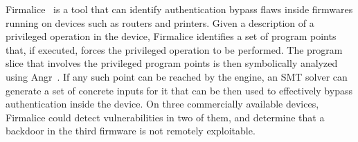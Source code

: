 Firmalice~\cite{FIRMALICE-NDSS15} is a tool that can identify authentication bypass flaws inside firmwares running on devices such as routers and printers. Given a description of a privileged operation in the device, Firmalice identifies a set of program points that, if executed, forces the privileged operation to be performed. The program slice that involves the privileged program points is then symbolically analyzed using {\sc Angr}~\cite{ANGR-SSP16}. If any such point can be reached by the engine, an SMT solver can generate a set of concrete inputs for it that can be then used to effectively bypass authentication inside the device. On three commercially available devices, Firmalice could detect vulnerabilities in two of them, and determine that a backdoor in the third firmware is not remotely exploitable.